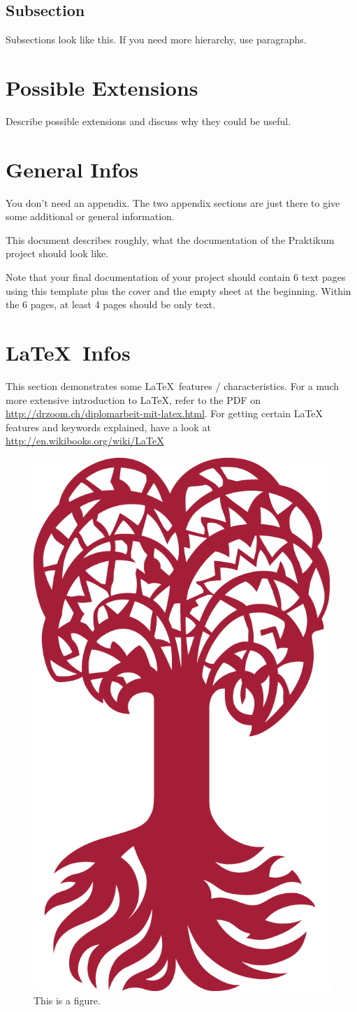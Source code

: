\documentclass{utue} %
\begin{document}
\subsection{Subsection}

Subsections look like this. If you need more hierarchy, use paragraphs.

\section{Possible Extensions}

Describe possible extensions and discuss why they could be useful.


\appendix

\section{General Infos}

You don't need an appendix. The two appendix sections are just there to give some additional or general information.

This document describes roughly, what the documentation of the Praktikum project should look like.

Note that your final documentation of your project should contain 6 text pages using this template plus the cover and the empty sheet at the beginning. Within the 6 pages, at least 4 pages should be only text.

\section{\LaTeX~Infos}

This section demonstrates some \LaTeX~features / characteristics. For a much more extensive introduction to \LaTeX, refer to the PDF on \url{http://drzoom.ch/diplomarbeit-mit-latex.html}. For getting certain LaTeX features and keywords explained, have a look at \url{http://en.wikibooks.org/wiki/LaTeX}

\begin{figure}[h!]
  \centering
  \includegraphics[width=.4\columnwidth]{images/Tuebingen_CorporateElements/UT_BM_Rot_RGB_tr_01.png}
  \caption{This is a figure.}
  \label{fig:figure1}
\end{figure}
\end{document}

